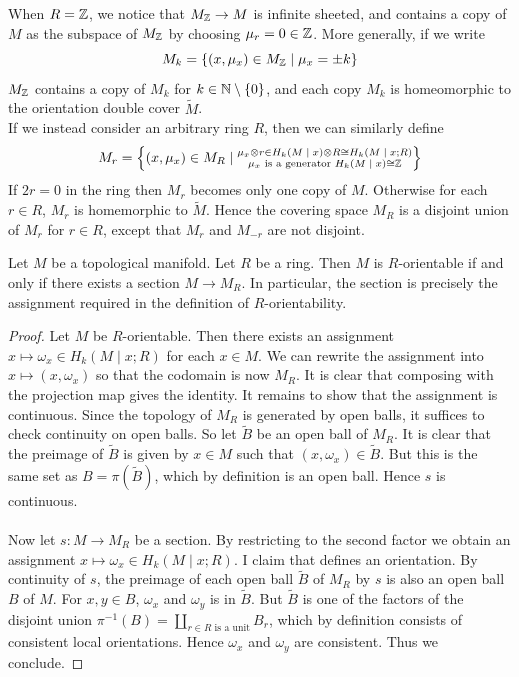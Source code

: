 \documentclass[a4paper]{article}
\begin{document}
When $R=\mathbb{Z}$, we notice that $M_{\mathbb{Z}}\to M$ is infinite sheeted, and contains a copy of $M$ as the subspace of $M_{\mathbb{Z}}$ by choosing $\mu_r=0\in\mathbb{Z}$. More generally, if we write $$M_k=\{(x,\mu_x)\in M_{\mathbb{Z}}\;|\;\mu_x=\pm k\}$$ $M_{\mathbb{Z}}$ contains a copy of $M_k$ for $k\in\mathbb{N}\setminus\{0\}$, and each copy $M_k$ is homeomorphic to the orientation double cover $\widetilde{M}$. \\

If we instead consider an arbitrary ring $R$, then we can similarly define $$M_r=\left\{(x,\mu_x)\in M_R\;|\;\substack{\mu_x\otimes r\in H_k(M\;|\; x)\otimes R\cong H_k(M\;|\; x;R)\\\mu_x\text{ is a generator }H_k(M\;|\;x)\cong\mathbb{Z}}\right\}$$ If $2r=0$ in the ring then $M_r$ becomes only one copy of $M$. Otherwise for each $r\in R$, $M_r$ is homemorphic to $\widetilde{M}$. Hence the covering space $M_R$ is a disjoint union of $M_r$ for $r\in R$, except that $M_r$ and $M_{-r}$ are not disjoint. 

\begin{lmm}{}{} Let $M$ be a topological manifold. Let $R$ be a ring. Then $M$ is $R$-orientable if and only if there exists a section $M\to M_R$. In particular, the section is precisely the assignment required in the definition of $R$-orientability. \tcbline
\begin{proof}
Let $M$ be $R$-orientable. Then there exists an assignment $x\mapsto\omega_x\in H_k(M\;|\;x;R)$ for each $x\in M$. We can rewrite the assignment into $x\mapsto(x,\omega_x)$ so that the codomain is now $M_R$. It is clear that composing with the projection map gives the identity. It remains to show that the assignment is continuous. Since the topology of $M_R$ is generated by open balls, it suffices to check continuity on open balls. So let $\widetilde{B}$ be an open ball of $M_R$. It is clear that the preimage of $\widetilde{B}$ is given by $x\in M$ such that $(x,\omega_x)\in\widetilde{B}$. But this is the same set as $B=\pi(\widetilde{B})$, which by definition is an open ball. Hence $s$ is continuous. \\~\\

Now let $s:M\to M_R$ be a section. By restricting to the second factor we obtain an assignment $x\mapsto\omega_x\in H_k(M\;|\;x;R)$. I claim that defines an orientation. By continuity of $s$, the preimage of each open ball $\widetilde{B}$ of $M_R$ by $s$ is also an open ball $B$ of $M$. For $x,y\in B$, $\omega_x$ and $\omega_y$ is in $\widetilde{B}$. But $\widetilde{B}$ is one of the factors of the disjoint union $\pi^{-1}(B)=\coprod_{r\in R\text{ is a unit}}B_r$, which by definition consists of consistent local orientations. Hence $\omega_x$ and $\omega_y$ are consistent. Thus we conclude. 
\end{proof}
\end{lmm}
\end{document}
